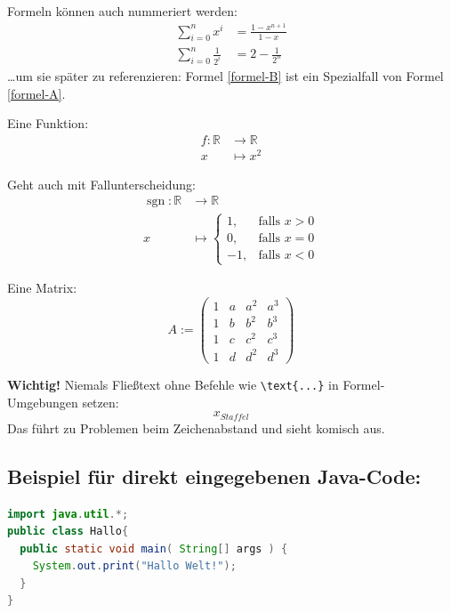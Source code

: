 Formeln können auch nummeriert werden:
\begin{align}
  \sum_{i=0}^{n} x^i &= \frac{1-x^{n+1}}{1-x}       \label{formel-A} \\
  \sum_{i=0}^{n} \frac{1}{2^i} &= 2 - \frac{1}{2^n} \label{formel-B}
\end{align}
\dots um sie später zu referenzieren: Formel \eqref{formel-B} ist ein Spezialfall von Formel \eqref{formel-A}.

Eine Funktion:
\begin{align*}
  f \colon \mathbb{R} &\longrightarrow \mathbb{R} \\
  x &\longmapsto x^2
\end{align*}

Geht auch mit Fallunterscheidung:
\begin{align*}
  \operatorname{sgn} \colon \mathbb{R} &\longrightarrow \mathbb{R} \\
  x &\longmapsto \begin{cases}
    1, & \text{falls } x > 0 \\
    0, & \text{falls } x = 0 \\
    -1, & \text{falls } x < 0
  \end{cases}
\end{align*}

Eine Matrix:
\[
  A := \begin{pmatrix}
    1 & a & a^2 & a^3 \\
    1 & b & b^2 & b^3 \\
    1 & c & c^2 & c^3 \\
    1 & d & d^2 & d^3
  \end{pmatrix}
\]

\textbf{Wichtig!} Niemals Fließtext ohne Befehle wie \texttt{\textbackslash text\{...\}} in Formel-Umgebungen setzen:
\[
  x_{Staffel}
\]
Das führt zu Problemen beim Zeichenabstand und sieht komisch aus.


\subsection*{Beispiel für direkt eingegebenen Java-Code:}

\begin{lstlisting}[language=java]
import java.util.*;
public class Hallo{
  public static void main( String[] args ) {
    System.out.print("Hallo Welt!");
  }
}
\end{lstlisting}


